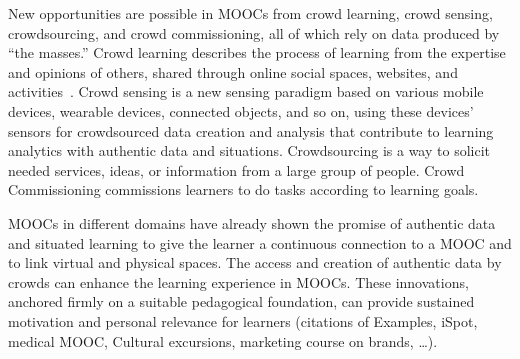 New opportunities are
possible in MOOCs from crowd learning, crowd sensing, crowdsourcing,
and crowd commissioning, all of which rely on data produced by ``the
masses.'' 
Crowd learning
describes the process of learning from the expertise and opinions of
others, shared through online social spaces, websites, and
activities~\cite{innovating-pedagogy-2013}. 
Crowd sensing is a new sensing
paradigm based on various mobile devices, wearable devices, connected
objects, and so on,  using these devices' sensors for crowdsourced
data creation and analysis that contribute to learning analytics with
authentic data and situations. Crowdsourcing  is a way to solicit  needed
services, ideas, or information
from a large group of people. Crowd Commissioning 
commissions learners to do tasks according to learning goals.  

MOOCs in different domains have already shown the promise of
authentic data and situated learning to give the learner a continuous
connection to a MOOC and to link virtual and physical spaces.
The access and creation of authentic data by crowds can enhance the
learning experience in MOOCs. 
These innovations, anchored firmly on a suitable pedagogical foundation,
can provide sustained motivation and personal relevance for learners
(citations of Examples, iSpot, medical MOOC, Cultural excursions,
marketing course on brands, \ldots).


